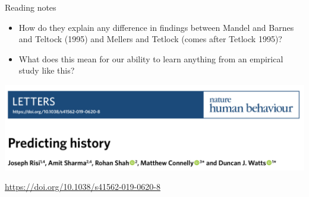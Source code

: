 \documentclass[aspectratio=169]{beamer}
\begin{document}
\begin{frame}

Reading notes
\begin{itemize}
\item How do they explain any difference in findings between Mandel and Barnes and Teltock (1995) and Mellers and Tetlock (comes after Tetlock 1995)?
\pause
\item What does this mean for our ability to learn anything from an empirical study like this?
\end{itemize}

\end{frame}
\begin{frame}

\begin{center}
\includegraphics[width=\textwidth]{figures/risi_predicting_2019_title}
\end{center}

\vfill
\url{https://doi.org/10.1038/s41562-019-0620-8}

\end{frame}
\end{document}
